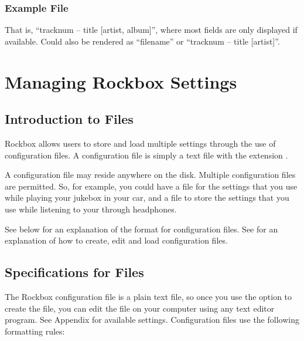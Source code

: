 \subsubsection{Example File}
\begin{example}
\end{example}
That is, ``tracknum -- title [artist, album]'', where most fields are only
displayed if available. Could also be rendered as ``filename'' or ``tracknum --
title [artist]''.

%

\section{\label{ref:manage_settings}Managing Rockbox Settings}

\subsection{Introduction to  Files}
Rockbox allows users to store and load multiple settings through the use of
configuration files. A configuration file is simply a text file with the
extension .

A configuration file may reside anywhere on the disk. Multiple
configuration files are permitted. So, for example, you could have
a  file for the settings that you use while playing your
jukebox in your car, and a  file to store the
settings that you use while listening to your \dap{} through headphones.

See  below for an explanation of the format
for configuration files. See  for an
explanation of how to create, edit and load configuration files.

\subsection{\label{ref:cfg_specs}Specifications for  Files}

The Rockbox configuration file is a plain text file, so once you use the
 option to create the file, you can edit the file on
your computer using any text editor program. See
Appendix  for available settings. Configuration
files use the following formatting rules: %

